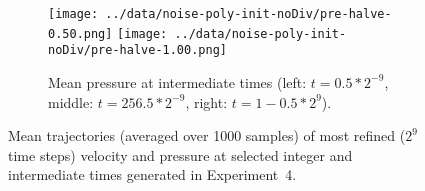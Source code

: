 \documentclass[tikz]{standalone}
\begin{document}
\begin{figure}
\begin{subfigure}[t]{1.00\textwidth}
       \hspace*{-7.4em} \texttt{[image: ../data/noise-poly-init-noDiv/pre-halve-0.50.png]}%
       \hspace*{-7.4em} \texttt{[image: ../data/noise-poly-init-noDiv/pre-halve-1.00.png]}
       \vspace*{-3em}
        \caption{Mean pressure at intermediate times (left: $t = 0.5*2^{-9}$, middle: $t = 256.5*2^{-9} $, right: $t = 1 - 0.5*2^9$).}
\end{subfigure}
\caption{Mean trajectories (averaged over 1000 samples) of most refined ($2^9$ time steps) velocity and pressure at selected integer and intermediate times generated in Experiment~4. }
\end{figure}
\end{document}
